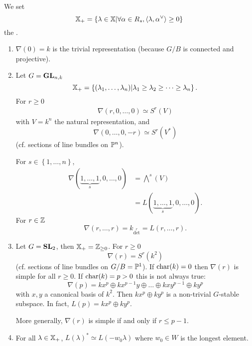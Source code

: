 	We set
	\[
		\XX_+ = \left\{ \lambda\in \XX \middle| \forall \alpha\in R_s, \left<\lambda,\alpha
		^{\vee} \right> \ge 0 \right\}
	\]
	the .
	\begin{example}
		\begin{enumerate}[(1)]
			\item $\nabla(0)=k$ is the trivial representation (because $G /B$ is connected and projective).
			\item Let $G=\GL_{n,k}$
				\[
					\XX_+ = \left\{ (\lambda_1,\dots,\lambda_n) \middle| \lambda_1\ge \lambda_2\ge
					\dots\ge \lambda_n \right\} .
				\]
				For $r\ge 0$
				\begin{align*}
					\nabla(r,0,\dots,0) \simeq S^{r}(V)
				\end{align*}
				with $V=k^{n}$ the natural representation, and
				\[
					\nabla(0,\dots,0,-r) \simeq S^{r}(V^{*})
				\]
				(cf. sections of line bundles on $\P^{n}$).

				For $s \in \left\{ 1,\dots,n \right\} $,
				\begin{align*}
					\nabla(\underbrace{1,\dots,1}_{s},0,\dots,0) &= \bigwedge^{s}(V) \\
					&= L(\underbrace{1,\dots,1}_s,0,\dots,0).
				\end{align*}
				For $r\in \Z$
				\[
					\nabla(r,\dots,r) = k_{\det ^{r}} = L(r,\dots,r).
				\]
			\item Let $G=\SL_2$, then $\XX_+ = \Z_{\ge 0}$. For $r\ge 0$
				\[
					\nabla(r) = S^{r}(k^2)
				\]
				(cf. sections of line bundles on $G /B=\P^{1}$). If $\car(k)=0$ then $\nabla(r)$ is
				simple for all $r\ge 0$. If $\car(k)=p>0$ this is not always true:
				\[
					\nabla(p) = kx^{p} \oplus kx^{p-1}y \oplus \dots \oplus kxy^{p-1} \oplus ky^{p}
				\]
				with $x,y$ a canonical basis of $k^2$. Then $kx^{p}\oplus ky^{p}$ is a non-trivial
				$G$-stable subspace. In fact, $L(p) = kx^{p}\oplus ky^{p}$.

				More generally, $\nabla(r)$ is simple if and only if $r\le p-1$.
			\item For all $\lambda\in \XX_+$, $L(\lambda)^{*}\simeq L(-w_0\lambda)$ where $w_0\in
				W$ is the longest element.
		\end{enumerate}
	\end{example}

